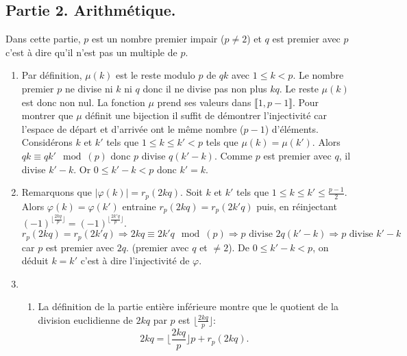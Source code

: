 \subsection*{Partie 2. Arithmétique.}
Dans cette partie, $p$ est un nombre premier impair ($p\neq 2$) et $q$ est premier avec $p$ c'est à dire qu'il n'est pas un multiple de $p$.
\begin{enumerate}
  \item Par définition, $\mu(k)$ est le reste modulo $p$ de $qk$ avec $1 \leq k < p$. Le nombre premier $p$ ne divise ni $k$ ni $q$ donc il ne divise pas non plus $kq$. Le reste $\mu(k)$ est donc non nul. La fonction $\mu$ prend ses valeurs dans $\llbracket 1,p-1\rrbracket$. Pour montrer que $\mu$ définit une bijection il suffit de démontrer l'injectivité car l'espace de départ et d'arrivée ont le même nombre ($p-1$) d'éléments.\newline
  Considérons $k$ et $k'$ tels que $1\leq k \leq k' < p$ tels que $\mu(k) = \mu(k')$. Alors $qk \equiv qk' \mod (p)$ donc $p$ divise $q(k'-k)$. Comme $p$ est premier avec $q$, il divise $k'-k$. Or $0\leq k' - k < p$ donc $k' = k$.   

  \item Remarquons que $|\varphi(k)| = r_p(2kq)$.\newline
  Soit $k$ et $k'$ tels que $1 \leq k \leq k' \leq \frac{p-1}{2}$. Alors $\varphi(k) = \varphi(k')$ entraine $r_p(2kq) = r_p(2k'q)$ puis, en réinjectant $(-1)^{\lfloor \frac{2kq}{p} \rfloor} = (-1)^{\lfloor \frac{2k'q}{p} \rfloor}$.
\[
  r_p(2kq) = r_p(2k'q) \Rightarrow 2kq \equiv 2k'q \mod (p) \Rightarrow p \text{ divise } 2q(k'-k) \Rightarrow p \text{ divise } k'-k
\]
car $p$ est premier avec $2q$. (premier avec $q$ et $\neq 2$). De $0\leq k' - k < p$, on déduit $k=k'$ c'est à dire l'injectivité de $\varphi$.

  \item
  \begin{enumerate}
    \item La définition de la partie entière inférieure montre que le quotient de la division euclidienne de $2kq$ par $p$ est $\lfloor\frac{2kq}{p}\rfloor$:
\[
  2kq = \lfloor \frac{2kq}{p}\rfloor p + r_p(2kq).
\]


\end{enumerate}
\end{enumerate}
